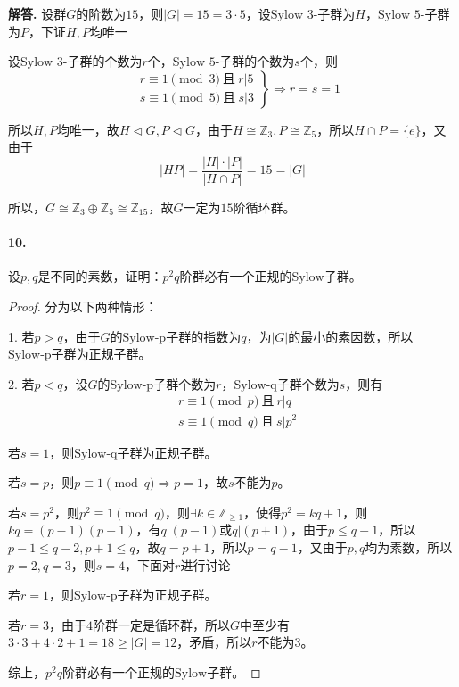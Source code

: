 \documentclass[12pt, a4paper, oneside]{ctexart}
\newenvironment{solution}{\par\noindent\textbf{解答. }}{\bigskip\par}
\begin{document}
\begin{solution}
    设群$G$的阶数为$15$，则$|G|=15=3\cdot 5$，设$\text{Sylow 3-子群}$为$H$，$\text{Sylow 5-子群}$为$P$，下证$H,P$均唯一

    设$\text{Sylow 3-子群}$的个数为$r$个，$\text{Sylow 5-子群}$的个数为$s$个，则
    \begin{equation*}
        \left.\begin{aligned}
            &r\equiv 1\pmod 3\ \text{且}\ r|5\\
            &s\equiv 1\pmod 5\ \text{且}\ s|3
        \end{aligned}\right\}
        \Rightarrow
        r=s=1
    \end{equation*}

    所以$H, P$均唯一，故$H\triangleleft G, P\triangleleft G$，由于$H\cong \mathbb{Z}_3, P\cong \mathbb{Z}_5$，所以$H\cap P = \{e\}$，又由于
    \begin{equation*}
        |HP|=\frac{|H|\cdot|P|}{|H\cap P|} = 15 = |G|
    \end{equation*}

    所以，$G\cong \mathbb{Z}_3\oplus \mathbb{Z}_5\cong \mathbb{Z}_{15}$，故$G$一定为$15$阶循环群。
\end{solution}
\paragraph{10.}设$p,q$是不同的素数，证明：$p^2q$阶群必有一个正规的$\text{Sylow子群}$。

\begin{proof}分为以下两种情形：

    1. 若$p>q$，由于$G$的$\text{Sylow-p子群}$的指数为$q$，为$|G|$的最小的素因数，所以$\text{Sylow-p子群}$为正规子群。

    2. 若$p<q$，设$G$的$\text{Sylow-p子群}$个数为$r$，$\text{Sylow-q子群}$个数为$s$，则有
    \begin{equation*}
        \begin{aligned}
            &r\equiv 1\pmod p\ \text{且}\ r|q\\
            &s\equiv 1\pmod q\ \text{且}\ s|p^2
        \end{aligned}
    \end{equation*}

    若$s=1$，则$\text{Sylow-q子群}$为正规子群。

    若$s=p$，则$p\equiv 1\pmod{q}\Rightarrow p=1$，故$s$不能为$p$。

    若$s=p^2$，则$p^2\equiv 1\pmod{q}$，则$\exists k\in \mathbb{Z}_{\geqslant 1}$，使得$p^2 = kq+1$，则$kq = (p-1)(p+1)$，有$q|(p-1)$或$q|(p+1)$，由于$p\leqslant q-1$，所以$p-1\leqslant q-2,p+1\leqslant q$，故$q=p+1$，所以$p=q-1$，又由于$p,q$均为素数，所以$p=2,q=3$，则$s=4$，下面对$r$进行讨论

    若$r=1$，则$\text{Sylow-p子群}$为正规子群。
    
    若$r=3$，由于$4$阶群一定是循环群，所以$G$中至少有$3\cdot 3+4\cdot 2 + 1 = 18\geqslant |G| = 12$，矛盾，所以$r$不能为$3$。

    综上，$p^2q$阶群必有一个正规的$\text{Sylow子群}$。

\end{proof}
\end{document}
